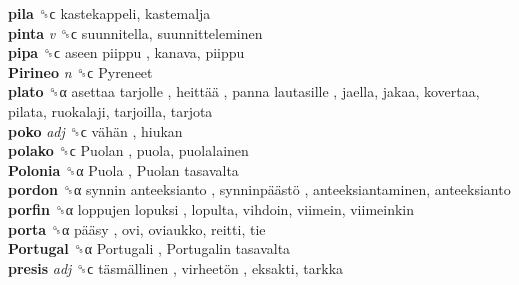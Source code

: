 \textbf{pila} ␝ϲ  kastekappeli, kastemalja  \\
\textbf{pinta} \emph{v}  ␝ϲ  suunnitella, suunnitteleminen  \\
\textbf{pipa} ␝ϲ   aseen piippu , kanava, piippu  \\
\textbf{Pirineo} \emph{n}  ␝ϲ   Pyreneet   \\
\textbf{plato} ␝α   asettaa tarjolle ,  heittää ,  panna lautasille , jaella, jakaa, kovertaa, pilata, ruokalaji, tarjoilla, tarjota  \\
\textbf{poko} \emph{adj}  ␝ϲ   vähän , hiukan  \\
\textbf{polako} ␝ϲ   Puolan , puola, puolalainen  \\
\textbf{Polonia} ␝α   Puola ,  Puolan tasavalta   \\
\textbf{pordon} ␝α   synnin anteeksianto ,  synninpäästö , anteeksiantaminen, anteeksianto  \\
\textbf{porfin} ␝α   loppujen lopuksi , lopulta, vihdoin, viimein, viimeinkin  \\
\textbf{porta} ␝α   pääsy , ovi, oviaukko, reitti, tie  \\
\textbf{Portugal} ␝α   Portugali ,  Portugalin tasavalta   \\
\textbf{presis} \emph{adj}  ␝ϲ   täsmällinen ,  virheetön , eksakti, tarkka  \\
